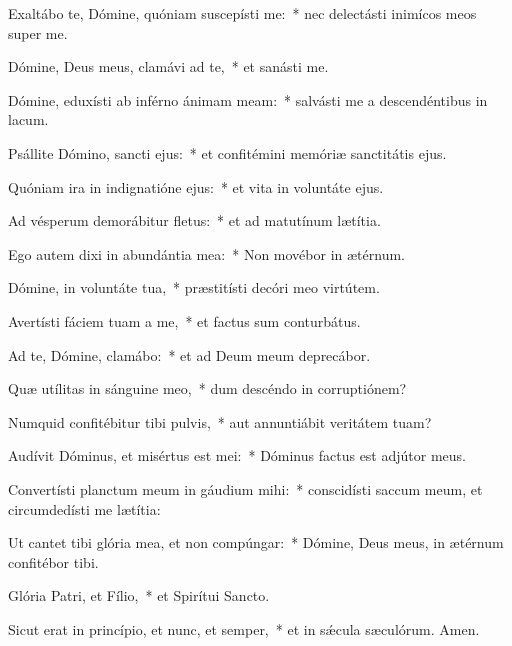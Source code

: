 \item Exaltábo te, Dómine, quóniam suscepísti me:~* nec delectásti inimícos meos super me.

\item Dómine, Deus meus, clamávi ad te,~* et sanásti me.

\item Dómine, eduxísti ab inférno ánimam meam:~* salvásti me a descendéntibus in lacum.

\item Psállite Dómino, sancti ejus:~* et confitémini memóriæ sanctitátis ejus.

\item Quóniam ira in indignatióne ejus:~* et vita in voluntáte ejus.

\item Ad vésperum demorábitur fletus:~* et ad matutínum lætítia.

\item Ego autem dixi in abundántia mea:~* Non movébor in ætérnum.

\item Dómine, in voluntáte tua,~* præstitísti decóri meo virtútem.

\item Avertísti fáciem tuam a me,~* et factus sum conturbátus.

\item Ad te, Dómine, clamábo:~* et ad Deum meum deprecábor.

\item Quæ utílitas in sánguine meo,~* dum descéndo in corruptiónem?

\item Numquid confitébitur tibi pulvis,~* aut annuntiábit veritátem tuam?

\item Audívit Dóminus, et misértus est mei:~* Dóminus factus est adjútor meus.

\item Convertísti planctum meum in gáudium mihi:~* conscidísti saccum meum, et circumdedísti me lætítia:

\item Ut cantet tibi glória mea, et non compúngar:~* Dómine, Deus meus, in ætérnum confitébor tibi.

\item Glória Patri, et Fílio,~* et Spirítui Sancto.

\item Sicut erat in princípio, et nunc, et semper,~* et in sǽcula sæculórum. Amen.

